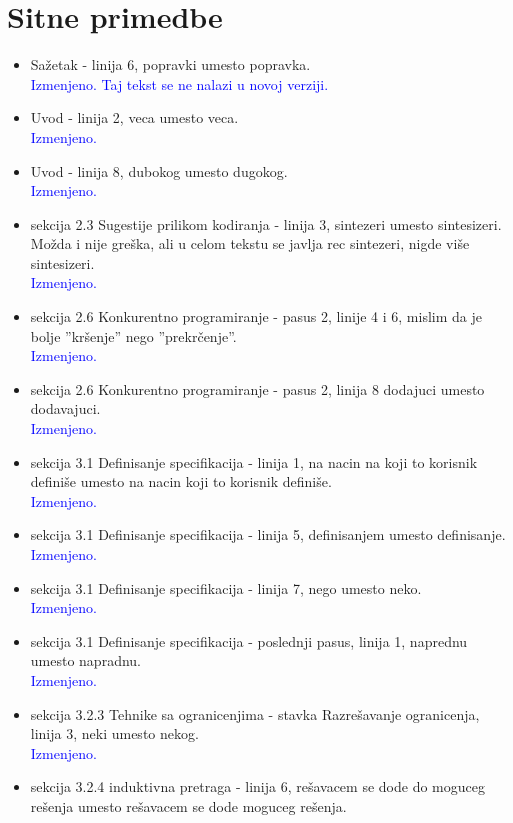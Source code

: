 \documentclass[a4paper]{report}
\newcommand{\odgovor}[1]{\textcolor{blue}{#1}}
\begin{document}
\section{Sitne primedbe}
\begin{itemize}
    \item Sažetak - linija 6, popravki umesto popravka.\\
	\odgovor{Izmenjeno. Taj tekst se ne nalazi u novoj verziji.}
    \item Uvod - linija 2, veca umesto veca.\\
	\odgovor{Izmenjeno.}
    \item Uvod - linija 8, dubokog umesto dugokog.\\
	\odgovor{Izmenjeno.}
    \item sekcija 2.3 Sugestije prilikom kodiranja - linija 3, sintezeri umesto sintesizeri. Možda i nije greška, ali u celom tekstu se javlja rec sintezeri, nigde više sintesizeri.\\
	\odgovor{Izmenjeno.}
    \item sekcija 2.6 Konkurentno programiranje - pasus 2, linije 4 i 6, mislim da je bolje ''kršenje'' nego ''prekrčenje''.\\
	\odgovor{Izmenjeno.}
    \item sekcija 2.6 Konkurentno programiranje - pasus 2, linija 8 dodajuci umesto dodavajuci.\\
	\odgovor{Izmenjeno.}
    \item sekcija 3.1 Definisanje specifikacija - linija 1, na nacin na koji to korisnik definiše umesto na nacin koji to korisnik definiše.\\
	\odgovor{Izmenjeno.}
    \item sekcija 3.1 Definisanje specifikacija - linija 5, definisanjem umesto definisanje.\\
	\odgovor{Izmenjeno.}
    \item sekcija 3.1 Definisanje specifikacija - linija 7, nego umesto neko.\\
	\odgovor{Izmenjeno.}
	\item sekcija 3.1 Definisanje specifikacija - poslednji pasus, linija 1, naprednu umesto napradnu.\\
	\odgovor{Izmenjeno.}
    \item sekcija 3.2.3 Tehnike sa ogranicenjima - stavka Razrešavanje ogranicenja, linija 3, neki umesto nekog.\\
	\odgovor{Izmenjeno.}
    \item sekcija 3.2.4 induktivna pretraga - linija 6, rešavacem se dode do moguceg rešenja umesto rešavacem se dode moguceg rešenja.\\

\end{itemize}
\end{document}
